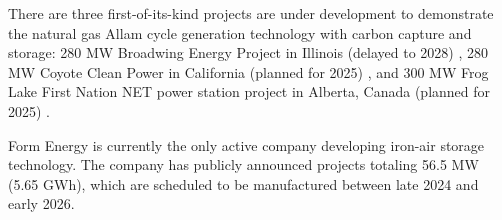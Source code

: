 \documentclass[pdflatex,sn-basic, Numbered]{sn-jnl}
\begin{document}

There are three first-of-its-kind projects are under development to demonstrate the natural gas Allam cycle generation technology with carbon capture and storage:  280 MW Broadwing Energy Project in Illinois (delayed
to 2028) \cite{BroadwingEnergyProject}, 280 MW Coyote Clean Power in California (planned for 2025) \cite{CoyoteCleanPower}, and 300 MW Frog Lake First Nation NET power station project in Alberta, Canada (planned for 2025) \cite{FrogLakeProject}.

Form Energy is currently the only active company developing iron-air storage technology. The company has publicly announced projects totaling 56.5 MW (5.65 GWh), which are scheduled to be manufactured between late 2024 and early 2026. \cite{FormEnergyLatest2024}

%
\end{document}
